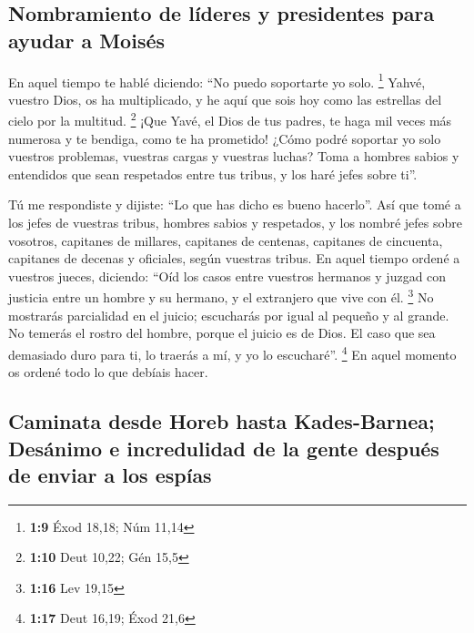 \begin{paracol}{2}
\hypertarget{nombramiento-de-luxedderes-y-presidentes-para-ayudar-a-moisuxe9s}{%
\subsection{Nombramiento de líderes y presidentes para ayudar a
Moisés}\label{nombramiento-de-luxedderes-y-presidentes-para-ayudar-a-moisuxe9s}}

 En aquel tiempo te hablé diciendo: ``No puedo soportarte
yo solo. \footnote{\textbf{1:9} Éxod 18,18; Núm 11,14} 
Yahvé, vuestro Dios, os ha multiplicado, y he aquí que sois hoy como las
estrellas del cielo por la multitud. \footnote{\textbf{1:10} Deut 10,22;
  Gén 15,5}  ¡Que Yavé, el Dios de tus padres, te haga
mil veces más numerosa y te bendiga, como te ha prometido!
 ¿Cómo podré soportar yo solo vuestros problemas,
vuestras cargas y vuestras luchas?  Toma a hombres sabios
y entendidos que sean respetados entre tus tribus, y los haré jefes
sobre ti''.

 Tú me respondiste y dijiste: ``Lo que has dicho es bueno
hacerlo''.  Así que tomé a los jefes de vuestras tribus,
hombres sabios y respetados, y los nombré jefes sobre vosotros,
capitanes de millares, capitanes de centenas, capitanes de cincuenta,
capitanes de decenas y oficiales, según vuestras tribus. 
En aquel tiempo ordené a vuestros jueces, diciendo: ``Oíd los casos
entre vuestros hermanos y juzgad con justicia entre un hombre y su
hermano, y el extranjero que vive con él. \footnote{\textbf{1:16} Lev
  19,15}  No mostrarás parcialidad en el juicio;
escucharás por igual al pequeño y al grande. No temerás el rostro del
hombre, porque el juicio es de Dios. El caso que sea demasiado duro para
ti, lo traerás a mí, y yo lo escucharé''. \footnote{\textbf{1:17} Deut
  16,19; Éxod 21,6}  En aquel momento os ordené todo lo
que debíais hacer.

\hypertarget{caminata-desde-horeb-hasta-kades-barnea-desuxe1nimo-e-incredulidad-de-la-gente-despuuxe9s-de-enviar-a-los-espuxedas}{%
\subsection{Caminata desde Horeb hasta Kades-Barnea; Desánimo e
incredulidad de la gente después de enviar a los
espías}\label{caminata-desde-horeb-hasta-kades-barnea-desuxe1nimo-e-incredulidad-de-la-gente-despuuxe9s-de-enviar-a-los-espuxedas}}


\end{paracol}
